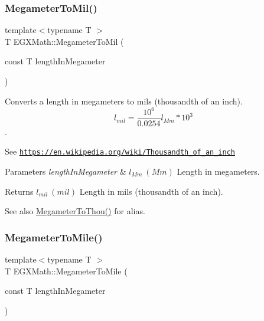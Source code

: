\subsubsection{\texorpdfstring{Megameter\+To\+Mil()}{MegameterToMil()}}
{\footnotesize\ttfamily template$<$typename T $>$ \\
T E\+G\+X\+Math\+::\+Megameter\+To\+Mil (\begin{DoxyParamCaption}\item[{const T}]{length\+In\+Megameter }\end{DoxyParamCaption})}



Converts a length in megameters to mils (thousandth of an inch). \[ l_{mil}= \frac{10^{6}}{0.0254} l_{Mm} * 10^{3} \]. 

See \href{https://en.wikipedia.org/wiki/Thousandth_of_an_inch}{\tt https\+://en.\+wikipedia.\+org/wiki/\+Thousandth\+\_\+of\+\_\+an\+\_\+inch} 
\begin{DoxyParams}{Parameters}
{\em length\+In\+Megameter} & $ l_{Mm}\ (Mm)$ Length in megameters. \\
\hline
\end{DoxyParams}
\begin{DoxyReturn}{Returns}
$ l_{mil}\ (mil)$ Length in mils (thousandth of an inch). 
\end{DoxyReturn}
\begin{DoxySeeAlso}{See also}
\mbox{\hyperlink{group___e_g_x_math-_conversions-_length_conversions-_megameter-_imperial_gae791a30b052a322fff88090e90fe32b5}{Megameter\+To\+Thou()}} for alias. 
\end{DoxySeeAlso}
\mbox{\label{group___e_g_x_math-_conversions-_length_conversions-_megameter-_imperial_gaa20a079fd7502961010c93e0091ab17c}} 
\subsubsection{\texorpdfstring{Megameter\+To\+Mile()}{MegameterToMile()}}
{\footnotesize\ttfamily template$<$typename T $>$ \\
T E\+G\+X\+Math\+::\+Megameter\+To\+Mile (\begin{DoxyParamCaption}\item[{const T}]{length\+In\+Megameter }\end{DoxyParamCaption})}



